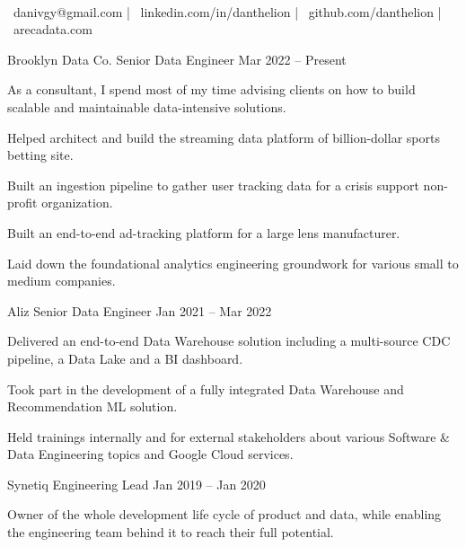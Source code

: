 \documentclass[]{awesome-cv}
\begin{document}
    
\begin{center}
	  \\
	\vspace{2mm}
	{\faEnvelope\ danivgy@gmail.com} | {\faLink\ linkedin.com/in/danthelion} | {\faLink\ github.com/danthelion} | {\faLink\ arecadata.com}
\end{center}
\begin{cventries}
	\cventry
	{Brooklyn Data Co.}
	{Senior Data Engineer}
	{Mar 2022 – Present}
	{}
	{\begin{cvitems}
		\item {As a consultant, I spend most of my time advising clients on how to build scalable and maintainable data-intensive solutions.}
		\item {Helped architect and build the streaming data platform of billion-dollar sports betting site.}
		\item {Built an ingestion pipeline to gather user tracking data for a crisis support non-profit organization.}
		\item {Built an end-to-end ad-tracking platform for a large lens manufacturer.}
		\item {Laid down the foundational analytics engineering groundwork for various small to medium companies.}
		\end{cvitems}}
	\cventry
	{Aliz}
	{Senior Data Engineer}
	{Jan 2021 – Mar 2022}
	{}
	{\begin{cvitems}
		\item {Delivered an end-to-end Data Warehouse solution including a multi-source CDC pipeline, a Data Lake and a BI dashboard.}
		\item {Took part in the development of a fully integrated Data Warehouse and Recommendation ML solution.}
		\item {Held trainings internally and for external stakeholders about various Software \& Data Engineering topics and Google Cloud services.}
		\end{cvitems}}
	\cventry
	{Synetiq}
	{Engineering Lead}
	{Jan 2019 – Jan 2020}
	{}
	{\begin{cvitems}
		\item {Owner of the whole development life cycle of product and data, while enabling the engineering team behind it to reach their full potential.}

\end{cvitems}}
\end{cventries}
\end{document}
